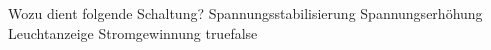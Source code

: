     {Wozu dient folgende Schaltung?}
    {Spannungsstabilisierung}
    {Spannungserhöhung}
    {Leuchtanzeige}
    {Stromgewinnung}
    {true}{false}